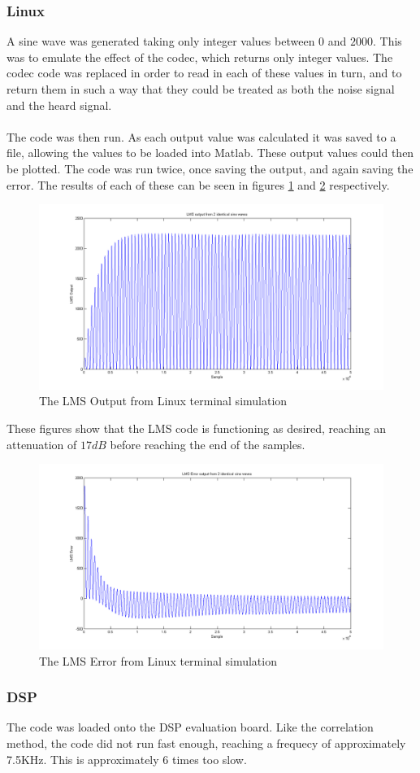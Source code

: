 \subsubsection{Linux}
A sine wave was generated taking only integer values between $0$ and $2000$.
This was to emulate the effect of the codec, which returns only integer values.
The codec code was replaced in order to read in each of these values in turn, and to return them in such a way that they could be treated as both the noise signal and the heard signal.
\\
\\
The code was then run.
As each output value was calculated it was saved to a file, allowing the values to be loaded into Matlab.
These output values could then be plotted.
The code was run twice, once saving the output, and again saving the error.
The results of each of these can be seen in figures \ref{fig:testlmslinuxout} and \ref{fig:testlmslinuxerr} respectively.

\begin{figure}[H]
	\centering
	\includegraphics[width=\textwidth]{./img/lms_linux_out.png}
	\caption{The LMS Output from Linux terminal simulation}
	\label{fig:testlmslinuxout}
\end{figure}

\noindent These figures show that the LMS code is functioning as desired, reaching an attenuation of $17dB$ before reaching the end of the samples.

\begin{figure}[H]
	\centering
	\includegraphics[width=\textwidth]{./img/lms_linux_err.png}
	\caption{The LMS Error from Linux terminal simulation}
	\label{fig:testlmslinuxerr}
\end{figure}

\subsubsection{DSP}
The code was loaded onto the DSP evaluation board.
Like the correlation method, the code did not run fast enough, reaching a frequecy of approximately 7.5KHz.
This is approximately 6 times too slow.

